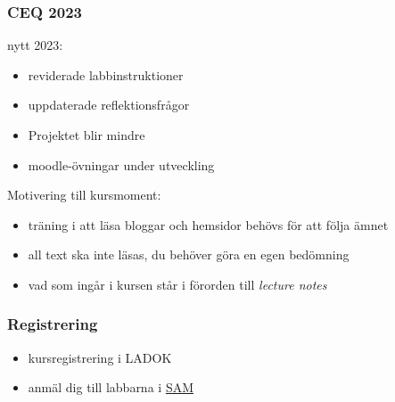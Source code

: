\documentclass[aspectratio=1610]{beamer}
\begin{document}
\begin{frame}
  \frametitle{CEQ 2023}
nytt 2023:
\begin{itemize}
  \item reviderade labbinstruktioner
  \item uppdaterade reflektionsfrågor
  \item Projektet blir mindre
  \item moodle-övningar under utveckling
\end{itemize}
Motivering till kursmoment:
\begin{itemize}
  \item träning i att läsa bloggar och hemsidor behövs för att följa ämnet
  \item all text ska inte läsas, du behöver göra en egen bedömning
  \item vad som ingår i kursen står i förorden till \emph{lecture notes}
\end{itemize}
\end{frame}

\begin{frame}
  \frametitle{Registrering}
\begin{itemize}
  \item kursregistrering i LADOK
  \item anmäl dig till labbarna i \href{https://sam.cs.lth.se/Labs}{SAM}
\end{itemize}

\end{frame}

\begin{frame}[plain]
  \endpage
\end{frame}

\end{document}
